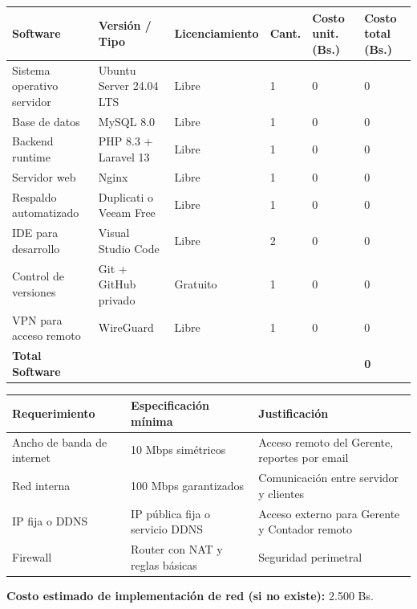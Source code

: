 \documentclass[stu]{apa7}
\begin{document}
\begin{longtable}{|L{4cm}|L{3cm}|L{2cm}|C{1.5cm}|C{2cm}|C{2cm}|}
\hline
{}
\textbf{Software} & \textbf{Versión / Tipo} & \textbf{Licenciamiento} & \textbf{Cant.} & \textbf{Costo unit. (Bs.)} & \textbf{Costo total (Bs.)} \\
\hline
Sistema operativo servidor & Ubuntu Server 24.04 LTS & Libre & 1 & 0 & 0 \\
\hline
Base de datos & MySQL 8.0 & Libre & 1 & 0 & 0 \\
\hline
Backend runtime & PHP 8.3 + Laravel 13 & Libre & 1 & 0 & 0 \\
\hline
Servidor web & Nginx & Libre & 1 & 0 & 0 \\
\hline
Respaldo automatizado & Duplicati o Veeam Free & Libre & 1 & 0 & 0 \\
\hline
IDE para desarrollo & Visual Studio Code & Libre & 2 & 0 & 0 \\
\hline
Control de versiones & Git + GitHub privado & Gratuito & 1 & 0 & 0 \\
\hline
VPN para acceso remoto & WireGuard & Libre & 1 & 0 & 0 \\
\hline
{}
\textbf{Total Software} & & & & & \textbf{0} \\
\hline
\end{longtable}

\begin{longtable}{|L{4cm}|L{5cm}|L{6cm}|}
\hline
{}
\textbf{Requerimiento} & \textbf{Especificación mínima} & \textbf{Justificación} \\
\hline
Ancho de banda de internet & 10 Mbps simétricos & Acceso remoto del Gerente, reportes por email \\
\hline
Red interna & 100 Mbps garantizados & Comunicación entre servidor y clientes \\
\hline
IP fija o DDNS & IP pública fija o servicio DDNS & Acceso externo para Gerente y Contador remoto \\
\hline
Firewall & Router con NAT y reglas básicas & Seguridad perimetral \\
\hline
\end{longtable}

\textbf{Costo estimado de implementación de red (si no existe):} 2.500 Bs.
\end{document}

